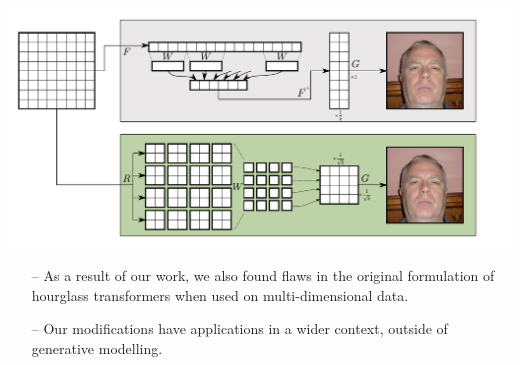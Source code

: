 \documentclass[14pt,margin=0.5in,innermargin=0in,blockverticalspace=-0.1in,colspace=-1.2cm]{tikzposter}
\begin{document}
\begin{columns}
{\begin{tcolorbox}[boxsep=0pt,top=0cm,bottom=0.6cm,adjusted title={\huge\bf Proposed Method},colbacktitle=colorOne]
        \begin{minipage}{0.75\linewidth}
        \begin{tikzfigure}
            \includegraphics[width=\linewidth]{resample.pdf}
        \end{tikzfigure}
        \end{minipage}
        \hspace{-2cm}
        \begin{minipage}{0.25\linewidth}
            \Large
            \begin{itemize}
                \item[--] As a result of our work, we also found flaws in the
                    original formulation of hourglass transformers when used on
                    multi-dimensional data.
                \item[--] Our modifications have applications in a wider
                    context, outside of generative modelling.
            \end{itemize}
        \end{minipage}
        \end{tcolorbox}
    }


\end{columns}
\end{document}
